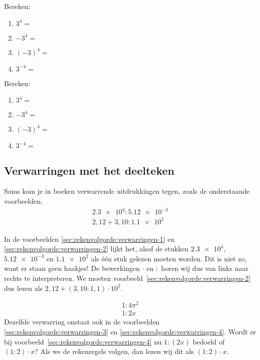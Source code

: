 \documentclass{tstextbook}
\begin{document}
\begin{exercise}
    Bereken:
        \begin{enumerate}
            \item $3^4 = $
            \item $-3^4 = $
            \item $(-3)^4 = $
            \item $3^{-4} = $
        \end{enumerate}
\end{exercise}

\begin{exercise}
    Bereken:
        \begin{enumerate}
            \item $3^4 = $
            \item $-3^4 = $
            \item $(-3)^4 = $
            \item $3^{-4} = $
        \end{enumerate}
\end{exercise}

\subsection{Verwarringen met het deelteken}
Soms kom je in boeken verwarrende uitdrukkingen tegen, zoals de onderstaande voorbeelden.
\begin{align}
\num{2.3e4} : \num{5.12e-3} \label{sec:rekenvolgorde:verwarringen-1}\\
2,12 + 3,10 : \num{1.1e2} \label{sec:rekenvolgorde:verwarringen-2}
\end{align}

In de voorbeelden \eqref{sec:rekenvolgorde:verwarringen-1} en \eqref{sec:rekenvolgorde:verwarringen-2} lijkt het, alsof de stukken $\num{2.3e4}$, $\num{5.12e-3}$ en $\num{1.1e2}$
als \'e\'en stuk gelezen moeten worden. 
Dit is niet zo, want er staan geen haakjes! 
De bewerkingen $\cdot$ en $:$ horen wij dus van links naar rechts te interpreteren.
We moeten voorbeeld~\eqref{sec:rekenvolgorde:verwarringen-2} dus lezen als $2,12 + (3,10 : 1,1) \cdot 10^2$.


\begin{align}
1 : 4\pi^2 \label{sec:rekenvolgorde:verwarringen-3}\\
1 : 2x \label{sec:rekenvolgorde:verwarringen-4}
\end{align}
Dezelfde verwarring onstaat ook in de voorbeelden \eqref{sec:rekenvolgorde:verwarringen-3} en \eqref{sec:rekenvolgorde:verwarringen-4}.
Wordt er bij voorbeeld~\eqref{sec:rekenvolgorde:verwarringen-4} nu $1 : (2x )$ bedoeld of $(1 : 2) \cdot x $?
Als we de rekenregels volgen, dan lezen wij dit als $(1 : 2) \cdot x $.
\end{document}
